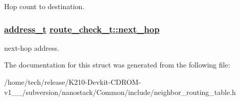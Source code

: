 Hop count to destination. \hypertarget{structroute__check__t_9bac5aab9dc6d8ff6209bbf6b8c7a75d}{
\subsubsection[next\_\-hop]{\setlength{\rightskip}{0pt plus 5cm}\hyperlink{address_8h_65ce5a1faf29ab669a1d3dc6ce26c2ab}{address\_\-t} \hyperlink{structroute__check__t_9bac5aab9dc6d8ff6209bbf6b8c7a75d}{route\_\-check\_\-t::next\_\-hop}}}
\label{structroute__check__t_9bac5aab9dc6d8ff6209bbf6b8c7a75d}


next-hop address. 

The documentation for this struct was generated from the following file:\begin{CompactItemize}
\item 
/home/tech/release/K210-Devkit-CDROM-v1\_\_/subversion/nanostack/Common/include/neighbor\_\-routing\_\-table.h\end{CompactItemize}
